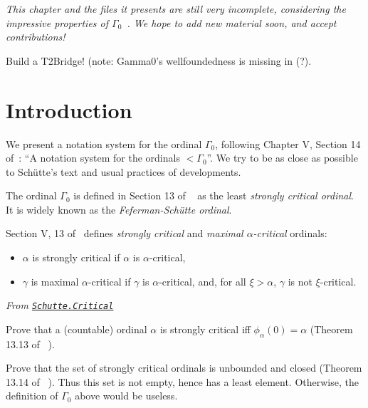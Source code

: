 \emph{This chapter and the files it presents are still very incomplete, considering the impressive properties of $\Gamma_0$~\cite{Gallier91}.  We hope to add new material soon, and accept contributions!}

\begin{todo}
  Build a T2Bridge! (note: Gamma0's wellfoundedness is missing in \gaia (?).
\end{todo}

\section{Introduction}
We present a notation system for the ordinal $\Gamma_0$, following Chapter V, Section 14 of~\cite{schutte}: ``A notation system for the ordinals $<\Gamma_0$''.
We try to be as close as possible to Schütte's text and usual practices of \coq{} developments.

The ordinal $\Gamma_0$ is defined in Section 13 of ~\cite{schutte} as the least \emph{strongly critical ordinal}. It is widely known as the \emph{Feferman-Schütte ordinal}.


Section V, 13 of~\cite{schutte} defines \emph{strongly critical} and
\emph{maximal $\alpha$-critical} ordinals: 

\begin{itemize}
\item $\alpha$ is strongly critical if
$\alpha$ is $\alpha$-critical,
\item $\gamma$ is maximal $\alpha$-critical if $\gamma$ is $\alpha$-critical, and, for all $\xi>\alpha$, $\gamma$ is not $\xi$-critical.

\end{itemize}





\vspace{4pt}

\noindent\emph{From \href{../theories/html/hydras.Schutte.Critical.html\#strongly_critical}%
{\texttt{Schutte.Critical}}}




\begin{project}
Prove that a (countable)  ordinal $\alpha$ is strongly critical iff 
$\phi_\alpha(0)=\alpha$ (Theorem 13.13 of~\cite{schutte} ). 
\end{project}


\begin{project}
Prove that the set of strongly critical ordinals is unbounded and closed (Theorem 13.14 of~\cite{schutte} ). Thus this set is not empty,  hence has a least element. Otherwise, the definition of $\Gamma_0$ above would be useless.
\end{project}




